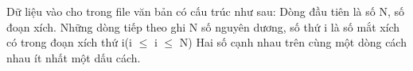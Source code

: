 Dữ liệu vào cho trong file văn bản có cấu trúc như sau:  Dòng đầu tiên là số N, số đoạn xích.  Những dòng tiếp theo ghi N số nguyên dương, số thứ i là số mắt xích có trong đoạn xích thứ i(i  $\le$  i  $\le$  N)  Hai số cạnh nhau trên cùng một dòng cách nhau ít nhất một dấu cách.  

\